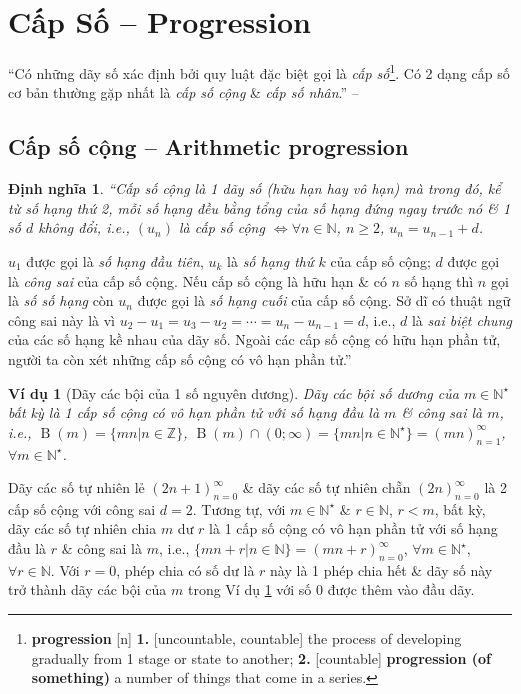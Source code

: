 \documentclass[oneside]{book}
\numberwithin{equation}{section}
\newtheorem{dinhnghia}{Định nghĩa}[section]
\newtheorem{vidu}{Ví dụ}[section]
\begin{document}

\section{Cấp Số -- Progression}
``Có những dãy số xác định bởi quy luật đặc biệt gọi là \textit{cấp số}\footnote{\textbf{progression} [n] \textbf{1.} [uncountable, countable] the process of developing gradually from 1 stage or state to another; \textbf{2.} [countable] \textbf{progression (of something)} a number of things that come in a series.}. Có 2 dạng cấp số cơ bản thường gặp nhất là \textit{cấp số cộng} \& \textit{cấp số nhân}.'' -- \cite[p. 123]{TL_chuyen_Toan_Dai_So_Giai_Tich_11}

\subsection{Cấp số cộng -- Arithmetic progression}

\begin{dinhnghia}
	``\emph{Cấp số cộng} là 1 dãy số (hữu hạn hay vô hạn) mà trong đó, kể từ số hạng thứ 2, mỗi số hạng đều bằng tổng của số hạng đứng ngay trước nó \& 1 số $d$ không đổi, i.e., $(u_n)$ là cấp số cộng $\Leftrightarrow\forall n\in\mathbb{N}$, $n\ge 2$, $u_n = u_{n-1} + d$.
\end{dinhnghia}
$u_1$ được gọi là \textit{số hạng đầu tiên}, $u_k$ là \textit{số hạng thứ $k$} của cấp số cộng; $d$ được gọi là \textit{công sai} của cấp số cộng. Nếu cấp số cộng là hữu hạn \& có $n$ số hạng thì $n$ gọi là \textit{số số hạng} còn $u_n$ được gọi là \textit{số hạng cuối} của cấp số cộng. Sở dĩ có thuật ngữ công sai này là vì $u_2 - u_1 = u_3 - u_2 = \cdots = u_n - u_{n-1} = d$, i.e., $d$ là \textit{sai biệt chung} của các số hạng kề nhau của dãy số. Ngoài các cấp số cộng có hữu hạn phần tử, người ta còn xét những cấp số cộng có vô hạn phần tử.''

\begin{vidu}[Dãy các bội của 1 số nguyên dương]
	\label{vidu:day boi cua 1 so nguyen duong}
	Dãy các bội số dương của $m\in\mathbb{N}^\star$ bất kỳ là 1 cấp số cộng có vô hạn phần tử với số hạng đầu là $m$ \& công sai là $m$, i.e., $\operatorname{B}(m) = \{mn|n\in\mathbb{Z}\}$, $\operatorname{B}(m)\cap(0;\infty) = \{mn|n\in\mathbb{N}^\star\} = (mn)_{n=1}^\infty$, $\forall m\in\mathbb{N}^\star$.
\end{vidu}
Dãy các số tự nhiên lẻ $(2n + 1)_{n=0}^\infty$ \& dãy các số tự nhiên chẵn $(2n)_{n=0}^\infty$ là 2 cấp số cộng với công sai $d = 2$. Tương tự, với $m\in\mathbb{N}^\star$ \& $r\in\mathbb{N}$, $r < m$, bất kỳ, dãy các số tự nhiên chia $m$ dư $r$ là 1 cấp số cộng có vô hạn phần tử với số hạng đầu là $r$ \& công sai là $m$, i.e., $\{mn + r|n\in\mathbb{N}\} = (mn + r)_{n=0}^\infty$, $\forall m\in\mathbb{N}^\star$, $\forall r\in\mathbb{N}$. Với $r = 0$, phép chia có số dư là $r$ này là 1 phép chia hết \& dãy số này trở thành dãy các bội của $m$ trong Ví dụ \ref{vidu:day boi cua 1 so nguyen duong} với số $0$ được thêm vào đầu dãy.
\end{document}
